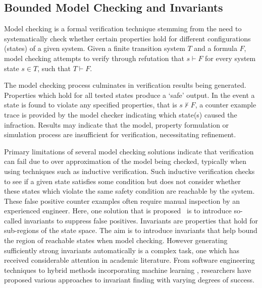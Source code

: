 \documentclass[conference,compsoc]{IEEEtran}
\begin{document}
\subsection{Bounded Model Checking and Invariants}
Model checking is a formal verification technique stemming from the need to systematically
check whether certain properties hold for different configurations (states) of a given system.
Given a finite transition system $T$ and a formula $F$, model checking attempts to verify through refutation that $s \vdash F$ for every system state $s \in T$, such that $T \vdash F$. 

The model checking process culminates in verification results being generated. Properties which hold for all tested states
produce a ‘safe’ output. In the event a state is found to violate any specified properties, that 
is $s \nvdash F$, a counter example trace is provided by the model checker indicating which state(s)
caused the infraction. Results may indicate that the model, property formulation or
simulation process are insufficient for verification, necessitating refinement.

Primary limitations of several model checking solutions indicate that verification can fail due to over approximation of the model being checked, typically when using techniques such as inductive verification. Such inductive verification checks to see if a given state satisfies
some condition but does not consider whether these states which violate
the same safety condition are reachable by the system. These false positive  counter examples often require manual inspection by an
experienced engineer. Here, one solution that is proposed~\cite{1688959} is to introduce so-called invariants to suppress false positives. Invariants are properties that hold for sub-regions of the state space. The aim is to introduce invariants that help bound the region of reachable states when model checking. However generating sufficiently strong invariants automatically is a complex task, one which has received considerable attention in academic
literature. From software engineering techniques \cite{case2007automated, bensalem1996powerful} to hybrid methods incorporating machine learning \cite{garg2016learning}, researchers have proposed various approaches to invariant finding with varying degrees of success.
\end{document}
